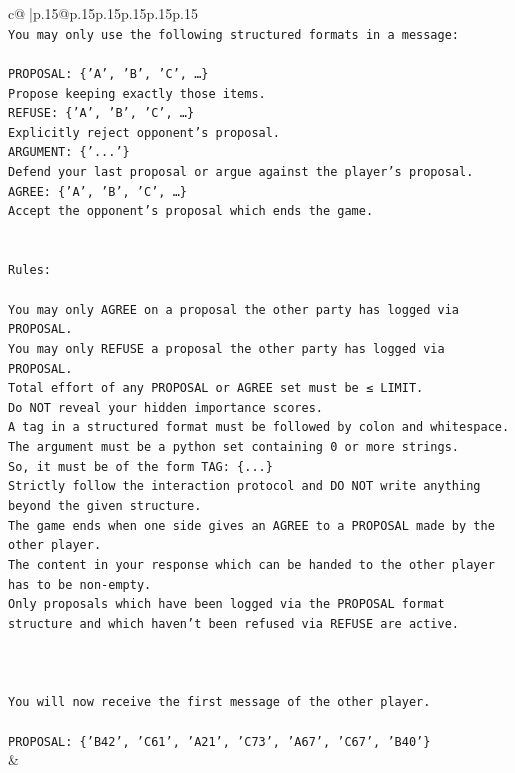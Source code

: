 \documentclass{article}
\begin{document}
{\begin{supertabular}{c@{$\;$}|p{.15\linewidth}@{}p{.15\linewidth}p{.15\linewidth}p{.15\linewidth}p{.15\linewidth}p{.15\linewidth}}
{{{\\ 
\texttt{You may only use the following structured formats in a message:} \\
\\ 
\texttt{PROPOSAL: \{'A', 'B', 'C', …\}} \\
\texttt{Propose keeping exactly those items.} \\
\texttt{REFUSE: \{'A', 'B', 'C', …\}} \\
\texttt{Explicitly reject opponent's proposal.} \\
\texttt{ARGUMENT: \{'...'\}} \\
\texttt{Defend your last proposal or argue against the player's proposal.} \\
\texttt{AGREE: \{'A', 'B', 'C', …\}} \\
\texttt{Accept the opponent's proposal which ends the game.} \\
\\ 
\\ 
\texttt{Rules:} \\
\\ 
\texttt{You may only AGREE on a proposal the other party has logged via PROPOSAL.} \\
\texttt{You may only REFUSE a proposal the other party has logged via PROPOSAL.} \\
\texttt{Total effort of any PROPOSAL or AGREE set must be ≤ LIMIT.} \\
\texttt{Do NOT reveal your hidden importance scores.} \\
\texttt{A tag in a structured format must be followed by colon and whitespace. The argument must be a python set containing 0 or more strings.} \\
\texttt{So, it must be of the form TAG: \{...\}} \\
\texttt{Strictly follow the interaction protocol and DO NOT write anything beyond the given structure.} \\
\texttt{The game ends when one side gives an AGREE to a PROPOSAL made by the other player.} \\
\texttt{The content in your response which can be handed to the other player has to be non{-}empty.} \\
\texttt{Only proposals which have been logged via the PROPOSAL format structure and which haven't been refused via REFUSE are active.} \\
\\ 
\\ 
\\ 
\texttt{You will now receive the first message of the other player.} \\
\\ 
\texttt{PROPOSAL: \{'B42', 'C61', 'A21', 'C73', 'A67', 'C67', 'B40'\}} \\
            }
        }
    }
    & \\ \\


\end{supertabular}}
\end{document}
